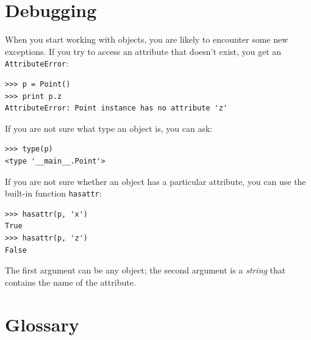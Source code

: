 \documentclass[12pt,a4paper,final,twoside,onecolumn,titlepage]{book}
\begin{document}
\section{Debugging}
\label{hasattr}

When you start working with objects, you are likely to encounter
some new exceptions.  If you try to access an attribute
that doesn't exist, you get an {\tt AttributeError}:

\begin{verbatim}
>>> p = Point()
>>> print p.z
AttributeError: Point instance has no attribute 'z'
\end{verbatim}
%
If you are not sure what type an object is, you can ask:

\begin{verbatim}
>>> type(p)
<type '__main__.Point'>
\end{verbatim}
%
If you are not sure whether an object has a particular attribute,
you can use the built-in function {\tt hasattr}:

\begin{verbatim}
>>> hasattr(p, 'x')
True
>>> hasattr(p, 'z')
False
\end{verbatim}
%
The first argument can be any object; the second argument is a {\em
string} that contains the name of the attribute.


\section{Glossary}
\end{document}

